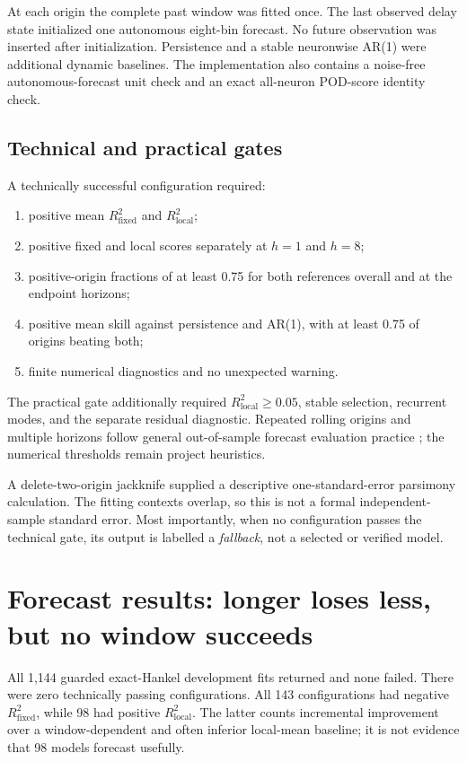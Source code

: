 \documentclass[11pt]{article}
\newcommand{\Rfixed}{R^2_{\mathrm{fixed}}}
\newcommand{\Rlocal}{R^2_{\mathrm{local}}}
\begin{document}
At each origin the complete past window was fitted once.  The last observed
delay state initialized one autonomous eight-bin forecast.  No future
observation was inserted after initialization.  Persistence and a stable
neuronwise AR(1) were additional dynamic baselines.  The implementation also
contains a noise-free autonomous-forecast unit check and an exact all-neuron
POD-score identity check.

\subsection{Technical and practical gates}

A technically successful configuration required:
\begin{enumerate}
\item positive mean \(\Rfixed\) and \(\Rlocal\);
\item positive fixed and local scores separately at \(h=1\) and \(h=8\);
\item positive-origin fractions of at least 0.75 for both references overall
and at the endpoint horizons;
\item positive mean skill against persistence and AR(1), with at least 0.75
of origins beating both;
\item finite numerical diagnostics and no unexpected warning.
\end{enumerate}
The practical gate additionally required \(\Rlocal\geq0.05\), stable
selection, recurrent modes, and the separate residual diagnostic.  Repeated
rolling origins and multiple horizons follow general out-of-sample forecast
evaluation practice \cite{tashman}; the numerical thresholds remain project
heuristics.

A delete-two-origin jackknife supplied a descriptive one-standard-error
parsimony calculation.  The fitting contexts overlap, so this is not a formal
independent-sample standard error.  Most importantly, when no configuration
passes the technical gate, its output is labelled a \emph{fallback}, not a
selected or verified model.

\section{Forecast results: longer loses less, but no window succeeds}

All 1,144 guarded exact-Hankel development fits returned and none failed.
There were zero technically passing configurations.  All 143 configurations
had negative \(\Rfixed\), while 98 had positive \(\Rlocal\).  The latter
counts incremental improvement over a window-dependent and often inferior
local-mean baseline; it is not evidence that 98 models forecast usefully.
\end{document}
